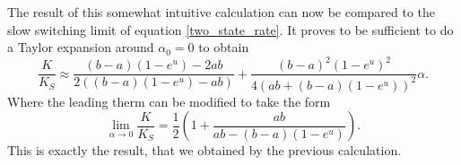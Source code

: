 The result of this somewhat intuitive calculation can now be compared to the slow switching limit of equation \eqref{two_state_rate}.
It proves to be sufficient to do a Taylor expansion around $\alpha_0 = 0$ to obtain
\begin{equation}
    \frac{K}{K_{S}} \approx \frac{(b-a)(1-e^u)-2ab }{2 \left((b-a) \left(1-e^u\right)-ab\right)} + \frac{  (b-a)^2\left(1-e^u\right)^2}{4 \left(ab + (b-a)(1-e^u)\right)^2} \alpha.
    \label{ksa}
\end{equation}
Where the leading therm can be modified to take the form
\begin{equation}
    \lim_{\alpha \rightarrow 0} \frac{K}{K_{S}} =\frac{1}{2}\left(1+ \frac{ab}{ab-(b-a) \left(1-e^u\right)}\right).
    \label{klim0a}
\end{equation}
This is exactly the result, that we obtained by the previous calculation.
